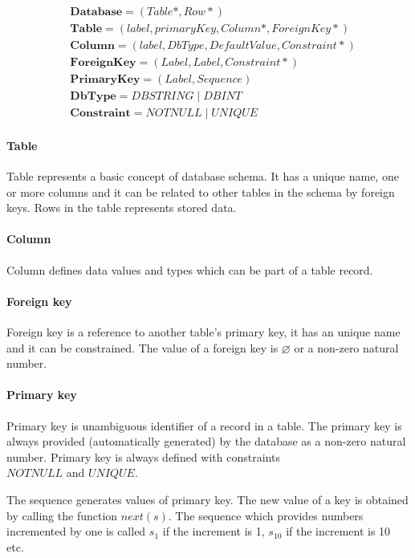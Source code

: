 \documentclass[runningheads]{comsis}
\begin{document}
\begin{align}
&	\mathbf{Database} = ( Table*, Row* )\\
&	\mathbf{Table} = (label, primaryKey, Column*, ForeignKey*)\\
&	\mathbf{Column} = (label, DbType, DefaultValue, Constraint*) \\
&	\mathbf{ForeignKey} = (Label, Label, Constraint*) \\
&	\mathbf{PrimaryKey} =  ( Label, Sequence ) \\
&	\mathbf{DbType} = DBSTRING \; | \; DBINT\\
&	\mathbf{Constraint} = NOTNULL \; | \; UNIQUE 
\end{align}

\paragraph{Table} Table represents a basic concept of database schema. It has a unique name, one or more columns and it can be related to other tables in the schema by foreign keys. Rows in the table represents stored data.

\paragraph{Column} Column defines data values and types which can be part of a table record.

\paragraph{Foreign key} Foreign key is a reference to another table's primary key, it has an unique name and it can be constrained. The value of a foreign key is $\varnothing$ or a non-zero natural number.

\paragraph{Primary key} Primary key is unambiguous identifier of a record in a table. The primary key is always provided (automatically generated) by the database as a non-zero natural number. Primary key is always defined with constraints\\ $NOTNULL$ and $UNIQUE$. 

The sequence generates values of primary key. The new value of a key is obtained by calling the function $next(s)$. The sequence which provides numbers incremented by one is called $s_1$ if the increment is 1, $s_{10}$ if the increment is 10 etc.
\end{document}
